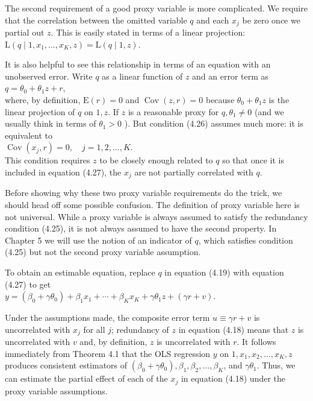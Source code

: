 \documentclass[10pt]{article}
\begin{document}
The second requirement of a good proxy variable is more complicated. We require that the correlation between the omitted variable $q$ and each $x_{j}$ be zero once we partial out $z$. This is easily stated in terms of a linear projection:\\
$\mathrm{L}\left(q \mid 1, x_{1}, \ldots, x_{K}, z\right)=\mathrm{L}(q \mid 1, z)$.

It is also helpful to see this relationship in terms of an equation with an unobserved error. Write $q$ as a linear function of $z$ and an error term as\\
$q=\theta_{0}+\theta_{1} z+r$,\\
where, by definition, $\mathrm{E}(r)=0$ and $\operatorname{Cov}(z, r)=0$ because $\theta_{0}+\theta_{1} z$ is the linear projection of $q$ on $1, z$. If $z$ is a reasonable proxy for $q, \theta_{1} \neq 0$ (and we usually think in terms of $\theta_{1}>0$ ). But condition (4.26) assumes much more: it is equivalent to\\
$\operatorname{Cov}\left(x_{j}, r\right)=0, \quad j=1,2, \ldots, K$.\\
This condition requires $z$ to be closely enough related to $q$ so that once it is included in equation (4.27), the $x_{j}$ are not partially correlated with $q$.

Before showing why these two proxy variable requirements do the trick, we should head off some possible confusion. The definition of proxy variable here is not universal. While a proxy variable is always assumed to satisfy the redundancy condition (4.25), it is not always assumed to have the second property. In Chapter 5 we will use the notion of an indicator of $q$, which satisfies condition (4.25) but not the second proxy variable assumption.

To obtain an estimable equation, replace $q$ in equation (4.19) with equation (4.27) to get\\
$y=\left(\beta_{0}+\gamma \theta_{0}\right)+\beta_{1} x_{1}+\cdots+\beta_{K} x_{K}+\gamma \theta_{1} z+(\gamma r+v)$.

Under the assumptions made, the composite error term $u \equiv \gamma r+v$ is uncorrelated with $x_{j}$ for all $j$; redundancy of $z$ in equation (4.18) means that $z$ is uncorrelated with $v$ and, by definition, $z$ is uncorrelated with $r$. It follows immediately from Theorem 4.1 that the OLS regression $y$ on $1, x_{1}, x_{2}, \ldots, x_{K}, z$ produces consistent estimators of $\left(\beta_{0}+\gamma \theta_{0}\right), \beta_{1}, \beta_{2}, \ldots, \beta_{K}$, and $\gamma \theta_{1}$. Thus, we can estimate the partial effect of each of the $x_{j}$ in equation (4.18) under the proxy variable assumptions.
\end{document}
